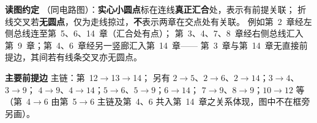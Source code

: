 \noindent\textbf{读图约定}
（同电路图）：\textbf{实心小圆点}标在连线\textbf{真正汇合}处，表示有前提关联；
折线交叉若\textbf{无圆点}，仅为走线掠过，\textbf{不}表示两章在交点处有关联。
例如第~2~章经左侧总线连至第~5、6、14~章（汇合处有点）；
第~3、4、7、8~章经右侧总线汇入第~9~章；第~4、6~章经另一竖廊汇入第~14~章——
第~3~章与第~14~章无直接前提边，其间若有线条交叉亦无圆点。

\noindent\textbf{主要前提边}
主链：第~12$\to$13$\to$14；
另有 $2\to5$、$2\to6$、$2\to14$；$3\to4$、$3\to9$；
$4\to9$、$4\to14$；$5\to6$、$5\to9$；$6\to14$；
$7\to9$、$8\to9$；$10\to12$ 等
（第~4$\to$6 由第~5$\to$6 主链及第~4、6 共入第~14~章之关系体现，图中不在框旁另画）。
